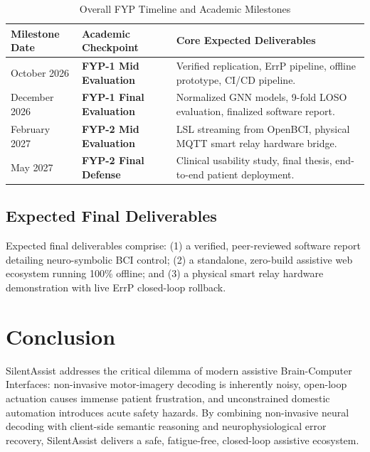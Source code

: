 \documentclass[12pt,a4paper]{report}
\begin{document}
\begin{table}[H]
\centering
\small
\caption{Overall FYP Timeline and Academic Milestones}
\label{tab:timeline}
\begin{tabularx}{\textwidth}{p{3.0cm} p{5.5cm} X}
\toprule
\textbf{Milestone Date} & \textbf{Academic Checkpoint} & \textbf{Core Expected Deliverables} \\
\midrule
October 2026 & \textbf{FYP-1 Mid Evaluation} & Verified replication, ErrP pipeline, offline prototype, CI/CD pipeline. \\
December 2026 & \textbf{FYP-1 Final Evaluation} & Normalized GNN models, 9-fold LOSO evaluation, finalized software report. \\
February 2027 & \textbf{FYP-2 Mid Evaluation} & LSL streaming from OpenBCI, physical MQTT smart relay hardware bridge. \\
May 2027 & \textbf{FYP-2 Final Defense} & Clinical usability study, final thesis, end-to-end patient deployment. \\
\bottomrule
\end{tabularx}
\end{table}

\section{Expected Final Deliverables}
Expected final deliverables comprise: (1) a verified, peer-reviewed software report detailing neuro-symbolic BCI control; (2) a standalone, zero-build assistive web ecosystem running 100\% offline; and (3) a physical smart relay hardware demonstration with live ErrP closed-loop rollback.

\chapter{Conclusion}

SilentAssist addresses the critical dilemma of modern assistive Brain-Computer Interfaces: non-invasive motor-imagery decoding is inherently noisy, open-loop actuation causes immense patient frustration, and unconstrained domestic automation introduces acute safety hazards. By combining non-invasive neural decoding with client-side semantic reasoning and neurophysiological error recovery, SilentAssist delivers a safe, fatigue-free, closed-loop assistive ecosystem.
\end{document}

